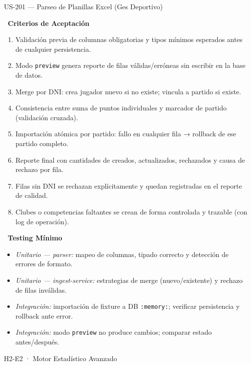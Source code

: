 \documentclass[11pt,a4paper]{article}
\newcommand{\fpath}[1]{\texttt{\small #1}}
\newcommand{\usfield}[2][\;]{%
  \par\vspace{5pt}%
  {\small\textbf{\textcolor{primary}{#2}}}\par\vspace{2pt}%
}
\begin{document}
\begin{uscard}{US-201 — Parseo de Planillas Excel (Ges Deportivo)}
\usfield{\faCheckCircle\ Criterios de Aceptación}
\begin{enumerate}[label=\textcolor{accent}{\textbf{AC\arabic*.}}, nosep, leftmargin=2.2em]
  \item Validación previa de columnas obligatorias y tipos mínimos esperados antes de cualquier persistencia.
  \item Modo \fpath{preview} genera reporte de filas válidas/erróneas sin escribir en la base de datos.
  \item Merge por DNI: crea jugador nuevo si no existe; vincula a partido si existe.
  \item Consistencia entre suma de puntos individuales y marcador de partido (validación cruzada).
  \item Importación atómica por partido: fallo en cualquier fila → rollback de ese partido completo.
  \item Reporte final con cantidades de creados, actualizados, rechazados y causa de rechazo por fila.
  \item Filas sin DNI se rechazan explícitamente y quedan registradas en el reporte de calidad.
  \item Clubes o competencias faltantes se crean de forma controlada y trazable (con log de operación).
\end{enumerate}

\usfield{\faFlask\ Testing Mínimo}
\begin{itemize}[nosep, leftmargin=1.6em]
  \item \textit{Unitario — parser:} mapeo de columnas, tipado correcto y detección de errores de formato.
  \item \textit{Unitario — ingest-service:} estrategias de merge (nuevo/existente) y rechazo de filas inválidas.
  \item \textit{Integración:} importación de fixture a DB \fpath{:memory:}; verificar persistencia y rollback ante error.
  \item \textit{Integración:} modo \fpath{preview} no produce cambios; comparar estado antes/después.
\end{itemize}

\end{uscard}

\begin{epicbox}{H2-E2 · Motor Estadístico Avanzado}
\end{epicbox}
\end{document}
